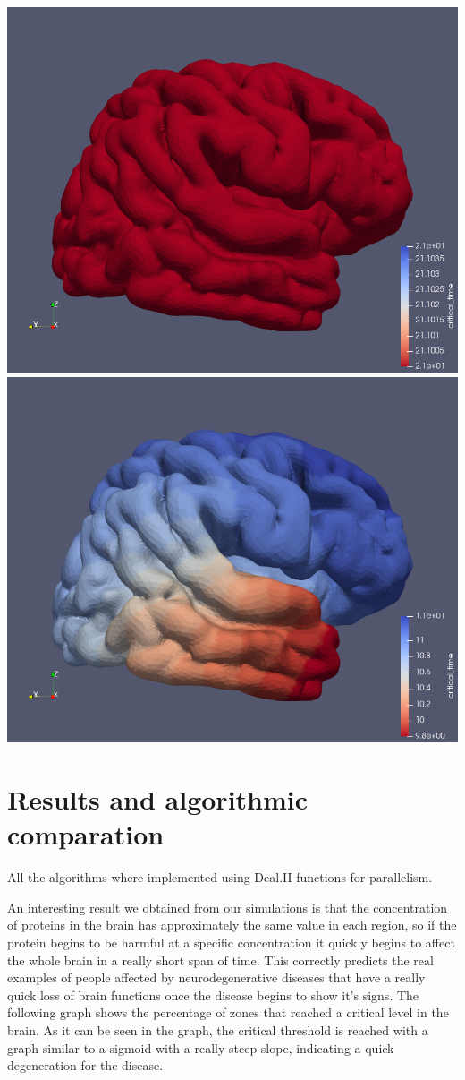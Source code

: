 \documentclass[12pt, letterpaper]{article}
\begin{document}
\includegraphics[scale=0.1]{pics/incdiff.png}
\includegraphics[scale=0.1]{pics/incgro.png}

\section{Results and algorithmic comparation}
All the algorithms where implemented using Deal.II functions for parallelism.


\noindent An interesting result we obtained from our simulations is that the concentration of proteins in the brain has approximately the same value in each region, so if the protein begins to be harmful at a specific concentration it quickly begins to affect the whole brain in a really short span of time. This correctly predicts the real examples of people affected by neurodegenerative diseases that have a really quick loss of brain functions once the disease begins to show it's signs. The following graph shows the percentage of zones that reached a critical level in the brain. As it can be seen in the graph, the critical threshold is reached with a graph similar to a sigmoid with a really steep slope, indicating a quick degeneration for the disease.
\end{document}

